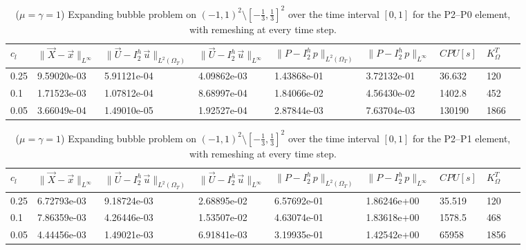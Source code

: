 \documentclass[a4paper,12pt,onecolumn]{article}
\newcommand{\errorXx}{\|\vec{X} - \vec{x}\|_{L^\infty}}
\newcommand{\LerrorUu}[1]{\|\vec U - I^h_{#1}\,\vec u\|_{L^2(\Omega_T)}}
\newcommand{\errorUu}[1]{\|\vec U - I^h_{#1}\,\vec u\|_{L^\infty}}
\newcommand{\errorPp}[1]{\|P - I^h_{#1}\,p\|_{L^\infty}}
\newcommand{\LerrorPp}[1]{\|P - I^h_{#1}\,p\|_{L^2(\Omega_T)}}
\begin{document}
\begin{table}
 \center
 \hspace*{-2cm}
\begin{tabular}{lllllllll}
\hline
$c_l$ & $\errorXx$ & $\LerrorUu2$ & $\errorUu2$ & $\LerrorPp2$ & $\errorPp2$ & $CPU[s]$ & $K_\Omega^T$\\
\hline
0.25 & 9.59020e-03 & 5.91121e-04 & 4.09862e-03 & 1.43868e-01 & 3.72132e-01 & 36.632 & 120\\
0.1 & 1.71523e-03 & 1.07812e-04 & 8.68997e-04 & 1.84066e-02 & 4.56430e-02 & 1402.8 & 452\\
0.05 & 3.66049e-04 & 1.49010e-05 & 1.92527e-04 & 2.87844e-03 & 7.63704e-03 & 130190 & 1866\\%
\hline
\end{tabular}
\hspace*{-2cm}
\caption{($\mu=\gamma=1$) Expanding bubble problem on $(-1,1)^2\setminus[-\frac{1}{3},\frac{1}{3}]^2$ over the time interval $[0,1]$ for the P2--P0 element, with remeshing at every time step.}
\label{tab:expandingbubble2Dp2p0remesh}
\end{table}

\begin{table}
 \center
 \hspace*{-2cm}
\begin{tabular}{lllllllll}
\hline
$c_l$ & $\errorXx$ & $\LerrorUu2$ & $\errorUu2$ & $\LerrorPp2$ & $\errorPp2$ & $CPU[s]$ & $K_\Omega^T$\\
\hline
0.25 & 6.72793e-03 & 9.18724e-03 & 2.68895e-02 & 6.57692e-01 & 1.86246e+00 & 35.519 & 120\\
0.1 & 7.86359e-03 & 4.26446e-03 & 1.53507e-02 & 4.63074e-01 & 1.83618e+00 & 1578.5 & 468\\
0.05 & 4.44456e-03 & 1.49021e-03 & 6.91841e-03 & 3.19935e-01 & 1.42542e+00 & 65958 & 1856\\
\hline
\end{tabular}
\hspace*{-2cm}
\caption{($\mu=\gamma=1$) Expanding bubble problem on $(-1,1)^2\setminus[-\frac{1}{3},\frac{1}{3}]^2$ over the time interval $[0,1]$ for the P2--P1 element, with remeshing at every time step.}
\label{tab:expandingbubble2Dp2p1remesh}
\end{table}
\end{document}
